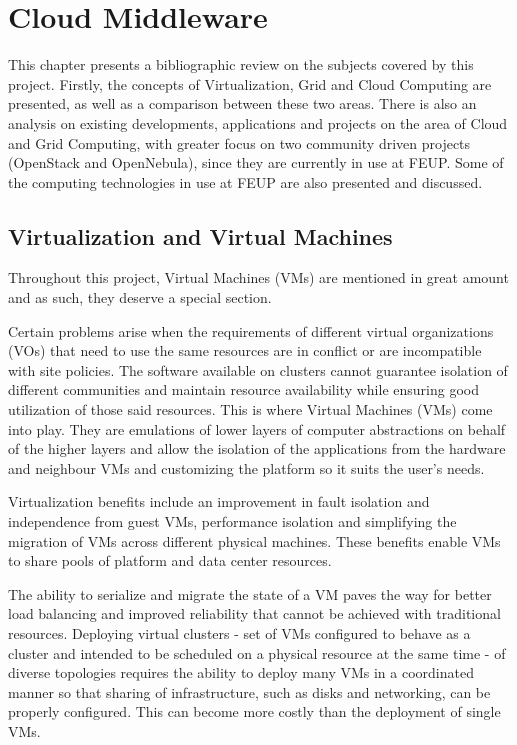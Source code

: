 \chapter{Cloud Middleware} \label{chap:sota}

This chapter presents a bibliographic review on the subjects covered by this project. Firstly, the concepts of Virtualization, Grid and Cloud Computing are presented, as well as a comparison between these two areas. There is also an analysis on existing developments, applications and projects on the area of Cloud and Grid Computing, with greater focus on two community driven projects (OpenStack and OpenNebula), since they are currently in use at FEUP. Some of the computing technologies in use at FEUP are also presented and discussed.

\section{Virtualization and Virtual Machines} \label{sec:virtualization} 

Throughout this project, Virtual Machines (VMs) are mentioned in great amount and as such, they deserve a special section.

Certain problems arise when the requirements of different virtual organizations (VOs) that need to use the same resources are in conflict or are incompatible with site policies. The software available on clusters cannot guarantee isolation of different communities and maintain resource availability while ensuring good utilization of those said resources. This is where Virtual Machines (VMs) come into play. They are emulations of lower layers of computer abstractions on behalf of the higher layers and allow the isolation of the applications from the hardware and neighbour VMs and customizing the platform so it suits the user's needs. \cite{clusters-grid, Zhang05virtualcluster} 

Virtualization benefits include an improvement in fault isolation and independence from guest VMs, performance isolation and simplifying the migration of VMs across different physical machines. These benefits enable VMs to share pools of platform and data center resources. \cite{virtualpower} 

The ability to serialize and migrate the state of a VM paves the way for better load balancing and improved reliability that cannot be achieved with traditional resources. Deploying virtual clusters - set of VMs configured to behave as a cluster and intended to be scheduled on a physical resource at the same time \cite{Zhang05virtualcluster} -  of diverse topologies requires the ability to deploy many VMs in a coordinated manner so that sharing of infrastructure, such as disks and networking, can be properly configured. This can become more costly than the deployment of single VMs.  

